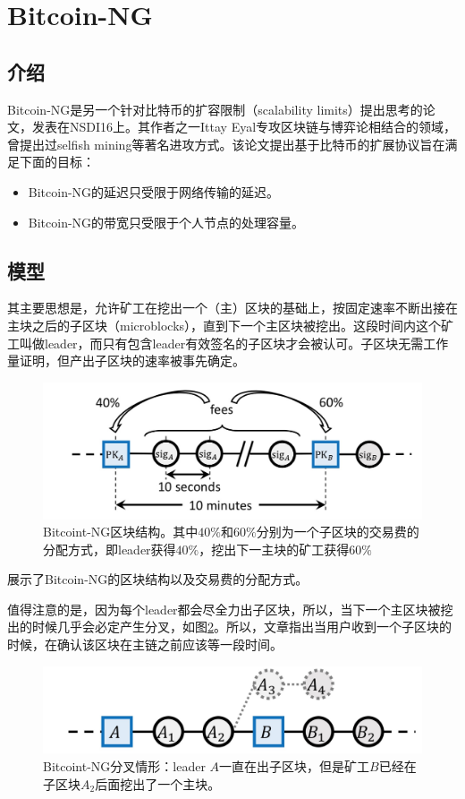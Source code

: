\section{Bitcoin-NG}
\subsection{介绍}
Bitcoin-NG是另一个针对比特币的扩容限制（scalability limits）提出思考的论文，发表在NSDI16上。其作者之一Ittay Eyal专攻区块链与博弈论相结合的领域，曾提出过selfish mining等著名进攻方式。该论文提出基于比特币的扩展协议旨在满足下面的目标：
\begin{itemize}
	\item Bitcoin-NG的延迟只受限于网络传输的延迟。
	\item Bitcoin-NG的带宽只受限于个人节点的处理容量。
	
\end{itemize}

\subsection{模型}
其主要思想是，允许矿工在挖出一个（主）区块的基础上，按固定速率不断出接在主块之后的子区块（microblocks），直到下一个主区块被挖出。这段时间内这个矿工叫做leader，而只有包含leader有效签名的子区块才会被认可。子区块无需工作量证明，但产出子区块的速率被事先确定。

\begin{figure}
	\centering
	\includegraphics[width=0.7 \textwidth]{../common/BTCNG_1.png}
	\caption{Bitcoint-NG区块结构。其中$40\%$和$60\%$分别为一个子区块的交易费的分配方式，即leader获得$40\%$，挖出下一主块的矿工获得$60\%$} 
	\label{fig:BTCNG1}
\end{figure}
展示了Bitcoin-NG的区块结构以及交易费的分配方式。

值得注意的是，因为每个leader都会尽全力出子区块，所以，当下一个主区块被挖出的时候几乎会必定产生分叉，如图\ref{fig:BTCNG2}。所以，文章指出当用户收到一个子区块的时候，在确认该区块在主链之前应该等一段时间。
\begin{figure}
	\centering
	\includegraphics[width=0.7	\textwidth]{../common/BTCNG_2.png}
	\caption{Bitcoint-NG分叉情形：leader $A$一直在出子区块，但是矿工$B$已经在子区块$A_2$后面挖出了一个主块。} 
	\label{fig:BTCNG2}
\end{figure}

